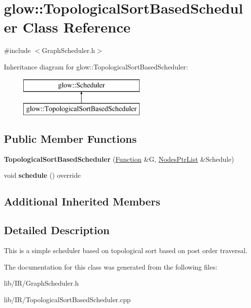 \hypertarget{classglow_1_1_topological_sort_based_scheduler}{}\section{glow\+:\+:Topological\+Sort\+Based\+Scheduler Class Reference}
\label{classglow_1_1_topological_sort_based_scheduler}


{\ttfamily \#include $<$Graph\+Scheduler.\+h$>$}

Inheritance diagram for glow\+:\+:Topological\+Sort\+Based\+Scheduler\+:\begin{figure}[H]
\begin{center}
\leavevmode
\includegraphics[height=2.000000cm]{classglow_1_1_topological_sort_based_scheduler}
\end{center}
\end{figure}
\subsection*{Public Member Functions}
\begin{DoxyCompactItemize}
\item 
\mbox{\label{classglow_1_1_topological_sort_based_scheduler_ab11202f3b34d03ccfd41b8de25ce776c}} 
{\bfseries Topological\+Sort\+Based\+Scheduler} (\hyperlink{classglow_1_1_function}{Function} \&G, \hyperlink{namespaceglow_a40ec79a2f9c485bfa999ed31fd0854dd}{Nodes\+Ptr\+List} \&Schedule)
\item 
\mbox{\label{classglow_1_1_topological_sort_based_scheduler_adf709b46eec7817afebcc10e86006015}} 
void {\bfseries schedule} () override
\end{DoxyCompactItemize}
\subsection*{Additional Inherited Members}


\subsection{Detailed Description}
This is a simple scheduler based on topological sort based on post order traversal. 

The documentation for this class was generated from the following files\+:\begin{DoxyCompactItemize}
\item 
lib/\+I\+R/Graph\+Scheduler.\+h\item 
lib/\+I\+R/Topological\+Sort\+Based\+Scheduler.\+cpp\end{DoxyCompactItemize}
